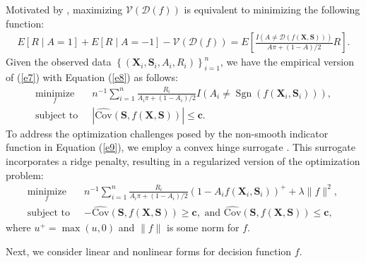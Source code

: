 \documentclass[12pt]{article}
\theoremstyle{plain}
\theoremstyle{definition}
\theoremstyle{remark}
\begin{document}
Motivated by \cite{zhao2012estimating}, maximizing $\mathcal{V}(\mathcal{D}(f))$ is equivalent to minimizing the following function:
\begin{equation}
\label{e8}
\begin{aligned}
E[R \mid A=1]+E[R \mid A=-1] -\mathcal{V}(\mathcal{D}(f))
 =E\left[\frac{I(A \neq \mathcal{D}(f(\boldsymbol{X}, \boldsymbol{S})))}{A \pi+(1-A) / 2} R\right].
\end{aligned}
\end{equation}
Given the observed data $\left\{\left(\boldsymbol{X}_i, \boldsymbol{S}_i, A_i, R_i\right)\right\}_{i=1}^n$, we have the empirical version of (\ref{e7}) with Equation (\ref{e8}) as follows:
\begin{equation}
\label{e9}
\begin{aligned}
\underset{f}{\operatorname{minimize}}\quad &n^{-1} \sum_{i=1}^n \frac{R_i}{A_i \pi+\left(1-A_i\right) / 2} I\left(A_i \neq \operatorname{\text{Sgn}}\left(f\left(\boldsymbol{X}_i,\boldsymbol{S}_i\right)\right)\right), \\
 \text {subject to } &|{\operatorname{\widehat{Cov}}\left(\boldsymbol{S}, f(\boldsymbol{X}, \boldsymbol{S})\right)}| \leq \boldsymbol{c}.
\end{aligned}
\end{equation}
To address the optimization challenges posed by the non-smooth indicator function in Equation (\ref{e9}), we employ a convex hinge surrogate \citep{zhao2012estimating}. This surrogate incorporates a ridge penalty, resulting in a regularized version of the optimization problem:
\begin{equation}
\label{e10}
\begin{aligned}
\underset{f}{\operatorname{minimize}}\quad &n^{-1} \sum_{i=1}^n \frac{R_i}{A_i \pi+\left(1-A_i\right) / 2}\left(1-A_i f\left(\boldsymbol{X}_i,\boldsymbol{S}_i\right)\right)^{+}+\lambda\|f\|^2 \text {, } \\
 \text {subject to } &-{\operatorname{\widehat{Cov}}\left(\boldsymbol{S}, f(\boldsymbol{X}, \boldsymbol{S})\right)} \geq \boldsymbol{c},  \text
 { and }
{\operatorname{\widehat{Cov}}\left(\boldsymbol{S}, f(\boldsymbol{X}, \boldsymbol{S})\right)} \leq \boldsymbol{c},
\end{aligned}
\end{equation}
where $u^{+}=\max (u, 0) $ and $\|f\| $ is some norm for $ f $.

Next, we consider linear and nonlinear forms for decision function $f$.
\end{document}
